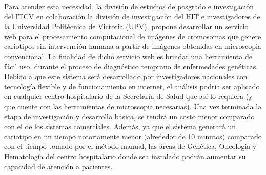 \documentclass[12pt,letterpaper,titlepage]{article}
\begin{document}
Para atender esta necesidad, la división de estudios de posgrado e investigación del ITCV en colaboración la división de investigación del HIT e investigadores de la Universidad Politécnica de Victoria (UPV), propone desarrollar un servicio web para el procesamiento computacional de imágenes de cromosomas que genere cariotipos sin intervención humana a partir de imágenes obtenidas en microscopia convencional. La finalidad de dicho servicio web es brindar una herramienta de fácil uso, durante el proceso de diagnóstico temprano de enfermedades genéticas. Debido a que este sistema será desarrollado por investigadores nacionales con tecnología flexible y de funcionamiento en internet, el análisis podría ser aplicado en cualquier centro hospitalario de la Secretaría de Salud que así lo requiera (y que cuente con las herramientas de microscopia necesarias). Una vez terminada la etapa de investigación y desarrollo básica, se tendrá un costo menor comparado con el de los sistemas comerciales. Además, ya que el sistema generará un cariotipo en un tiempo notoriamente menor (alrededor de 10 minutos) comparado con el tiempo tomado por el método manual, las áreas de Genética, Oncología y Hematología del centro hospitalario donde sea instalado podrán aumentar su capacidad de atención a pacientes. \\

\end{document}
